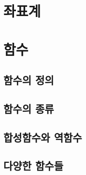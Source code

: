 \section{좌표계}

\section{함수}

\subsection{함수의 정의} 


\subsection{함수의 종류} 

\subsection{합성함수와 역함수} 


\subsection{다양한 함수들} 
